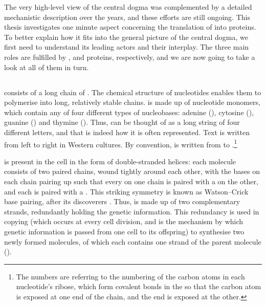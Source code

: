 The very high-level view of the central dogma was complemented by a detailed
mechanistic description over the years, and these efforts are still ongoing.
This thesis investigates one minute aspect concerning the translation of \rna
into proteins. To better explain how it fits into the general picture of the
central dogma, we first need to understand its leading actors and their
interplay. The three main roles are fulfilled by \dna, \rna and proteins,
respectively, and we are now going to take a look at all of them in turn.

\subsection{}

\dna consists of a long chain of .
The chemical structure of nucleotides enables them to polymerise into long,
relatively stable chains. \dna is made up of nucleotide monomers, which contain
any of four different types of nucleobases: adenine (\nA), cytosine (\nC),
guanine (\nG) and thymine (\nT). Thus, \dna can be thought of as a long string
of four different letters, and that is indeed how it is often represented. Text
is written from left to right in Western cultures. By convention, \dna is
written from \fivep to \threep.\footnote{The numbers are referring to the
numbering of the carbon atoms in each nucleotide’s ribose, which form covalent
bonds in the \dna so that the \fivep carbon atom is exposed at one end of the
chain, and the \threep end is exposed at the other.}

\dna is present in the cell in the form of double-stranded helices: each \dna
molecule consists of two paired chains, wound tightly around each other, with
the bases on each chain pairing up such that every \nA on one chain is paired
with a \nT on the other, and each \nC is paired with a \nG. This striking
symmetry is known as Watson–Crick base pairing, after its discoverers
\citep{Watson:1953}. Thus, \dna is made up of two complementary strands,
redundantly holding the genetic information. This redundancy is used in \dna
copying (which occurs at every cell division, and is the mechanism by which
genetic information is passed from one cell to its offspring) to synthesise two
newly formed \dna molecules, of which each contains one strand of the parent
\dna molecule ().

